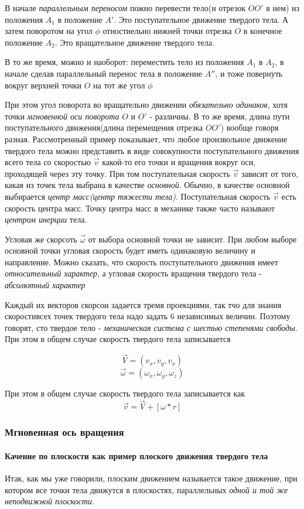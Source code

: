 \documentclass{article}
\begin{document}
В начале \emph{параллельным переносом} пожно перевести тело(и отрезок $OO'$ в нем) из положения $A_1$ в положение $A'$. Это поступательное движение твердого тела. А затем поворотом на угол $\phi$ отностиельно нижней точки отрезка $O$ в конечное положение $A_2$. Это вращательное движение твердого тела. 

В то же время, можно и наоборот: переместить тело из положения $A_1$ в $A_2$, в начале сделав параллельный перенос тела в положение $A''$, и тоже повернуть вокруг верхней точки $O$ на тот же угол $\phi$

При этом угол поворота во вращательно движении \emph{обязательно одинаков}, хотя точки \emph{мгновенной оси поворота} $O$ и $O'$ - различны. В то же время, длина пути поступательного движения(длина перемещения отрезка $OO'$) вообще говоря разная. Рассмотренный пример показывает, что любое произвольное движение твердого тела можно представить в виде совокупности поступательного движения всего тела со скоростью $\vec{v}$ какой-то его точки и вращения вокруг оси, проходящей через эту точку. При том поступательная скорость $\vec{v}$ зависит от того, какая из точек тела выбрана в качестве \emph{основной}. Обычно, в качестве основной выбирается \emph{центр масс(центр тяжести тела)}. Поступательная скорость $\vec{v}$ есть скорость центра масс. Точку центра масс в механике также часто называют \emph{центром инерции} тела. 

Угловая же скорсоть $\vec{\omega}$ от выбора основной точки не зависит. При любом выборе основной точки угловая скорость будет иметь одинаковую величину и направление. Можно сказать, что скорость поступательного движения имеет \emph{относительный характер}, а угловая скорость вращения твердого тела - \emph{абсолютный характер}


Каждый их векторов скорсои задается тремя проекциями, так тчо для знания скоростивсех точек твердого тела надо задать 6 независимых величин. Поэтому говорят, сто твердое тело - \emph{механическая система с шестью степенями свободы}. При этом в общем случае скорость твердого тела записывается

$$\vec{V} = (v_x, v_y, v_x)$$
$$\vec{\omega} = (\omega_x, \omega_y, \omega_z)$$

При этом в общем случае скорость твердого тела записывается как
$$\vec{v} = \vec{V} + [\omega*r]$$
\subsubsection{Мгновенная ось вращения}
\paragraph{Качение по плоскости как пример плоского движения твердого тела}
Итак, как мы уже говорили, плоским движением называется такое движение, при котором все точки тела движутся в плоскостях, параллельных \emph{одной и той же неподвижной плоскости}. 
\end{document}
